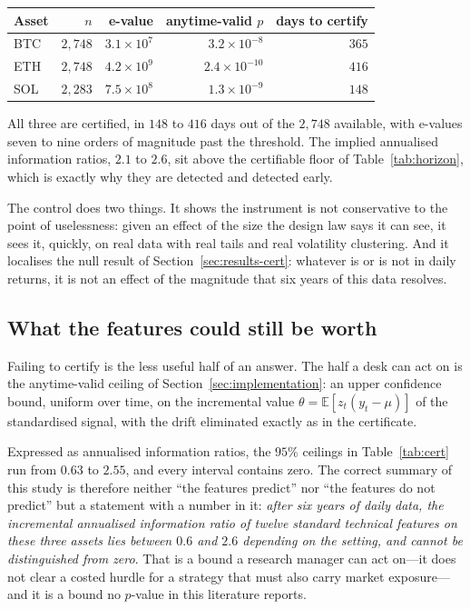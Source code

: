 \documentclass{article}
\theoremstyle{plain}
\theoremstyle{definition}
\begin{document}
\begin{center}
  \small
  \begin{tabular}{lrrrr}
    \toprule
    Asset & $n$ & e-value & anytime-valid $p$ & days to certify \\
    \midrule
    BTC & $2{,}748$ & $3.1\times10^{7}$ & $3.2\times10^{-8}$  & $365$ \\
    ETH & $2{,}748$ & $4.2\times10^{9}$ & $2.4\times10^{-10}$ & $416$ \\
    SOL & $2{,}283$ & $7.5\times10^{8}$ & $1.3\times10^{-9}$  & $148$ \\
    \bottomrule
  \end{tabular}
\end{center}

All three are certified, in $148$ to $416$ days out of the $2{,}748$ available, with e-values
seven to nine orders of magnitude past the threshold. The implied annualised information
ratios, $2.1$ to $2.6$, sit above the certifiable floor of Table~\ref{tab:horizon}, which is
exactly why they are detected and detected early.

The control does two things. It shows the instrument is not conservative to the point of
uselessness: given an effect of the size the design law says it can see, it sees it, quickly,
on real data with real tails and real volatility clustering. And it localises the null result
of Section~\ref{sec:results-cert}: whatever is or is not in daily returns, it is not an effect
of the magnitude that six years of this data resolves.

\subsection{What the features could still be worth}
\label{sec:ceiling}

Failing to certify is the less useful half of an answer. The half a desk can act on is the
anytime-valid ceiling of Section~\ref{sec:implementation}: an upper confidence bound,
uniform over time, on the incremental value $\theta=\mathbb{E}[z_t(y_t-\mu)]$ of the
standardised signal, with the drift eliminated exactly as in the certificate.

Expressed as annualised information ratios, the $95\%$ ceilings in Table~\ref{tab:cert} run
from $0.63$ to $2.55$, and every interval contains zero. The correct summary of this study
is therefore neither ``the features predict'' nor ``the features do not predict'' but a
statement with a number in it: \emph{after six years of daily data, the incremental
annualised information ratio of twelve standard technical features on these three assets
lies between $0.6$ and $2.6$ depending on the setting, and cannot be distinguished from
zero}. That is a bound a research
manager can act on---it does not clear a costed hurdle for a strategy that must also carry
market exposure---and it is a bound no $p$-value in this literature reports.
\end{document}
